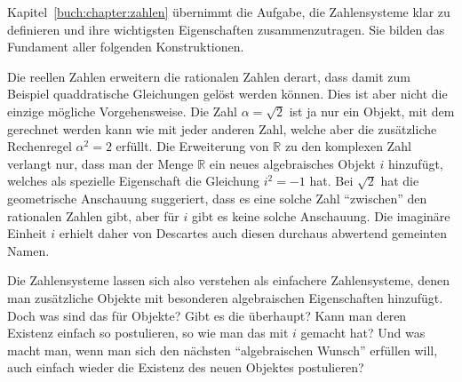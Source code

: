 Kapitel~\ref{buch:chapter:zahlen} übernimmt die Aufgabe, die Zahlensysteme
%
klar zu definieren und ihre wichtigsten Eigenschaften zusammenzutragen.
Sie bilden das Fundament aller folgenden Konstruktionen.

Die reellen Zahlen erweitern die rationalen Zahlen derart, dass damit
zum Beispiel quaddratische Gleichungen gelöst werden können.
Dies ist aber nicht die einzige mögliche Vorgehensweise.
Die Zahl $\alpha=\sqrt{2}$ ist ja nur ein Objekt, mit dem gerechnet werden
kann wie mit jeder anderen Zahl, welche aber die zusätzliche Rechenregel
$\alpha^2=2$ erfüllt.
Die Erweiterung von $\mathbb{R}$ zu den komplexen Zahl verlangt nur,
%
dass man der Menge $\mathbb{R}$ ein neues algebraisches Objekt $i$
hinzufügt, welches als spezielle Eigenschaft die Gleichung $i^2=-1$ hat.
Bei $\sqrt{2}$ hat die geometrische Anschauung suggeriert, dass es eine
solche Zahl ``zwischen'' den rationalen Zahlen gibt, aber für $i$
gibt es keine solche Anschauung.
Die imaginäre Einheit $i$ erhielt daher von Descartes auch diesen durchaus
abwertend gemeinten Namen.

Die Zahlensysteme lassen sich also verstehen als einfachere Zahlensysteme,
denen man zusätzliche Objekte mit besonderen algebraischen Eigenschaften
hinzufügt.
Doch was sind das für Objekte?
Gibt es die überhaupt?
Kann man deren Existenz einfach so postulieren, so wie man das mit $i$
gemacht hat?
Und was macht man, wenn man sich den nächsten ``algebraischen Wunsch''
erfüllen will, auch einfach wieder die Existenz des neuen Objektes
postulieren?

